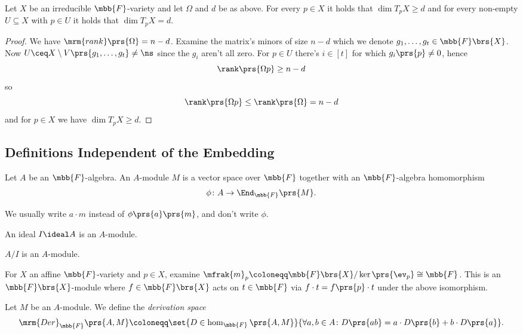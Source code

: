 \documentclass[10pt,a4paper,twoside,openany,hidelinks]{book}
\begin{document}
\begin{proposition}
Let $X$ be an irreducible $\mbb{F}$-variety and let $\Omega$ and $d$ be as above. For every $p \in X$ it holds that $\dim T_p X \geq d$ and for every non-empty $U \subseteq X$ with $p \in U$ it holds that $\dim T_p X = d$.
\end{proposition}

\begin{proof}
We have $\mrm{rank}\prs{\Omega} = n - d$. Examine the matrix's minors of size $n-d$ which we denote $g_1, \ldots, g_t \in \mbb{F}\brs{X}$.
Now $U \ceq X \setminus V\prs{g_1, \ldots, g_t} \neq \ns$ since the $g_i$ aren't all zero.
For $p \in U$ there's $i \in [t]$ for which $g_i\prs{p} \neq 0$, hence
\[\rank\prs{\Omega p} \geq n-d\]
so
\[\rank\prs{\Omega p} \leq \rank\prs{\Omega} = n - d\]
and for $p \in X$ we have $\dim T_p X \geq d$.
\end{proof}

\subsection{Definitions Independent of the Embedding}

\begin{definition}
Let $A$ be an $\mbb{F}$-algebra. An $A$-module $M$ is a vector space over $\mbb{F}$ together with an $\mbb{F}$-algebra homomorphism
\[\phi \colon A \to \End_{\mbb{F}}\prs{M} \text{.}\]
\end{definition}

\begin{notation}
We usually write $a \cdot m$ instead of $\phi\prs{a}\prs{m}$, and don't write $\phi$.
\end{notation}

\begin{example}
An ideal $I \ideal A$ is an $A$-module.
\end{example}

\begin{example}
$A/I$ is an $A$-module.
\end{example}

For $X$ an affine $\mbb{F}$-variety and $p \in X$, examine $\mfrak{m}_p \coloneqq \mbb{F}\brs{X} / \ker\prs{\ev_p} \cong \mbb{F}$. This is an $\mbb{F}\brs{X}$-module where $f \in \mbb{F}\brs{X}$ acts on $t \in \mbb{F}$ via $f \cdot t = f\prs{p} \cdot t$ under the above isomorphism.

\begin{definition}
Let $M$ be an $A$-module.
We define the \emph{derivation space}
\[\mrm{Der}_{\mbb{F}}\prs{A,M} \coloneqq \set{D \in \hom_{\mbb{F}}\prs{A, M}}{\forall a,b \in A \colon D\prs{ab} = a \cdot D\prs{b} + b \cdot D\prs{a}} \text{.}\]
\end{definition}
\end{document}
